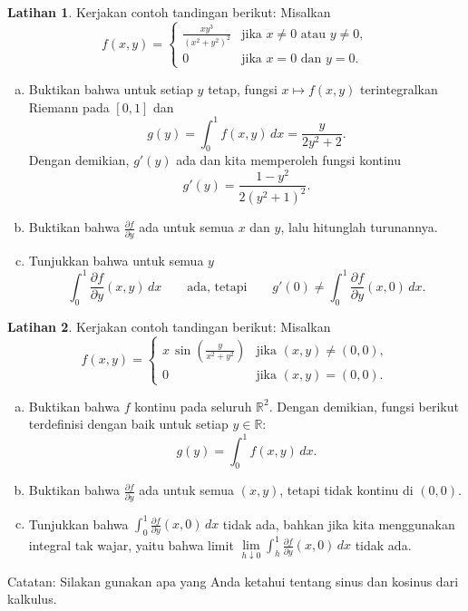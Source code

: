 \documentclass[12pt,openany]{book}
\newcommand{\R}{{\mathbb{R}}}
\theoremstyle{plain}
\theoremstyle{remark}
\theoremstyle{definition}
\newenvironment{exbox}{%
    \def\FrameCommand{\vrule width 1pt \relax\hspace{10pt}}%
    \MakeFramed{\advance\hsize-\width\FrameRestore}%
}{%
    \endMakeFramed
}
\newenvironment{exparts}{%
    \leavevmode\begin{enumerate}[a),noitemsep,topsep=0pt,parsep=0pt,partopsep=0pt]
}{%
    \end{enumerate}
}
\theoremstyle{exercise}
\newtheorem{exercise}{Latihan}[section]
\theoremstyle{example}
\begin{document}
\begin{exbox}
\begin{exercise}
\pagebreak[2]
Kerjakan contoh tandingan berikut: Misalkan
\begin{equation*}
f(x,y) =
\begin{cases}
\frac{xy^3}{{(x^2+y^2)}^2} & \text{jika } x \neq 0 \text{ atau } y \neq 0,\\
0 & \text{jika } x=0 \text{ dan } y=0.
\end{cases}
\end{equation*}
\begin{exparts}
\item
Buktikan bahwa untuk setiap $y$ tetap, fungsi $x \mapsto f(x,y)$
terintegralkan Riemann pada $[0,1]$ dan
\begin{equation*}
g(y) = \int_0^1 f(x,y) \, dx = \frac{y}{2y^2+2} .
\end{equation*}
Dengan demikian, $g'(y)$ ada dan kita memperoleh fungsi kontinu
\begin{equation*}
g'(y) = \frac{1-y^2}{2{(y^2+1)}^2} .
\end{equation*}
\item
Buktikan bahwa $\frac{\partial f}{\partial y}$ ada untuk semua $x$ dan $y$, lalu
hitunglah turunannya.
\item
Tunjukkan bahwa untuk semua $y$
\begin{equation*}
\int_0^1 \frac{\partial f}{\partial y} (x,y) \, dx
\qquad
\text{ada, tetapi}
\qquad
g'(0) \neq \int_0^1 \frac{\partial f}{\partial y} (x,0) \, dx .
\end{equation*}
\end{exparts}
\end{exercise}

\begin{exercise}
Kerjakan contoh tandingan berikut: Misalkan
\begin{equation*}
f(x,y) =
\begin{cases}
x \,\sin \left(\frac{y}{x^2+y^2}\right) & \text{jika } (x,y) \neq (0,0),\\
0 & \text{jika } (x,y)=(0,0).
\end{cases}
\end{equation*}
\begin{exparts}
\item
Buktikan bahwa $f$ kontinu pada seluruh $\R^2$.
Dengan demikian, fungsi berikut terdefinisi dengan baik untuk setiap $y \in \R$:
\begin{equation*}
g(y) = \int_0^1 f(x,y) \, dx .
\end{equation*}
\item
Buktikan bahwa $\frac{\partial f}{\partial y}$ ada untuk semua $(x,y)$,
tetapi tidak kontinu di $(0,0)$.
\item
Tunjukkan bahwa $\int_0^1 \frac{\partial f}{\partial y}(x,0) \, dx$ tidak
ada, bahkan jika kita menggunakan integral tak wajar, yaitu
bahwa limit
$\lim\limits_{h \downarrow 0} \int_h^1 \frac{\partial f}{\partial y}(x,0) \, dx$
tidak ada.
\end{exparts}
Catatan: Silakan gunakan apa yang Anda ketahui tentang sinus dan kosinus dari kalkulus.
\pagebreak[2]
\end{exercise}


\end{exbox}
\end{document}
